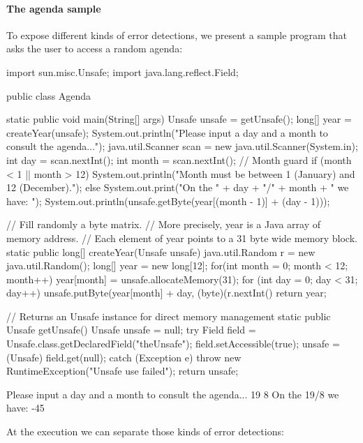 \documentclass[a4paper]{report}
\begin{document}
\paragraph{The agenda sample} To expose different kinds of error detections, we present a sample program that asks the user to access a random agenda:
\begin{java}
import sun.misc.Unsafe;
import java.lang.reflect.Field;

public class Agenda {
	
	static public void main(String[] args) {
		Unsafe unsafe = getUnsafe();
		long[] year = createYear(unsafe);
		System.out.println("Please input a day and a month to consult the agenda...");
		java.util.Scanner scan = new java.util.Scanner(System.in);
		int day = scan.nextInt();
		int month = scan.nextInt();
		// Month guard
		if (month < 1 || month > 12) {
			System.out.println("Month must be between 1 (January) and 12 (December).");
		} else {
			System.out.print("On the " + day + "/" + month + " we have: ");
			System.out.println(unsafe.getByte(year[(month - 1)] + (day - 1)));
		}
	}
	
	// Fill randomly a byte matrix.
	// More precisely, year is a Java array of memory address.
	// Each element of year points to a 31 byte wide memory block.
	static public long[] createYear(Unsafe unsafe) {
		java.util.Random r = new java.util.Random();
		long[] year = new long[12];
		for(int month = 0; month < 12; month++) {
			year[month] = unsafe.allocateMemory(31);
			for (int day = 0; day < 31; day++) {
				unsafe.putByte(year[month] + day, (byte)(r.nextInt() %
			}
		}
		return year;
	}
	
	// Returns an Unsafe instance for direct memory management
	static public Unsafe getUnsafe() {
		Unsafe unsafe = null;
		try {
			Field field = Unsafe.class.getDeclaredField("theUnsafe");
			field.setAccessible(true);
			unsafe = (Unsafe) field.get(null);
		} catch (Exception e) {
			throw new RuntimeException("Unsafe use failed");
		}
		return unsafe;
	}
	
}
\end{java}
\begin{shell}
Please input a day and a month to consult the agenda...
19
8
On the 19/8 we have: -45
\end{shell}
At the execution we can separate those kinds of error detections:
\end{document}
